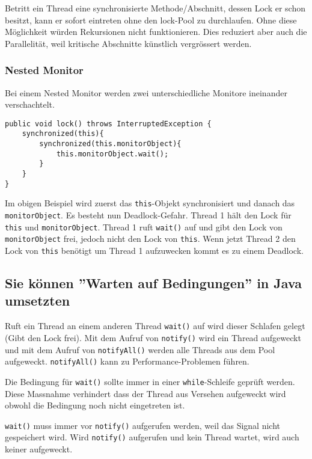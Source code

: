 Betritt ein Thread eine synchronisierte Methode/Abschnitt, dessen Lock er schon besitzt, kann er sofort eintreten ohne den lock-Pool zu durchlaufen. Ohne diese Möglichkeit würden Rekursionen nicht funktionieren. Dies reduziert aber auch die Parallelität, weil kritische Abschnitte künstlich vergrössert werden.

\subsubsection{Nested Monitor}

Bei einem Nested Monitor werden zwei unterschiedliche Monitore ineinander verschachtelt.

\begin{lstlisting}[caption={Nested Monitor},label=lst:nested_monitor]
public void lock() throws InterruptedException {
	synchronized(this){
		synchronized(this.monitorObject){
			this.monitorObject.wait();
		}
	}
}	  
\end{lstlisting}

Im obigen Beispiel wird zuerst das \texttt{this}-Objekt synchronisiert und danach das \texttt{monitorObject}. Es besteht nun Deadlock-Gefahr. Thread 1 hält den Lock für \texttt{this} und \texttt{monitorObject}. Thread 1 ruft \texttt{wait()} auf und gibt den Lock von \texttt{monitorObject} frei, jedoch nicht den Lock von \texttt{this}. Wenn jetzt Thread 2 den Lock von \texttt{this} benötigt um Thread 1 aufzuwecken kommt es zu einem Deadlock.

\subsection{Sie können ''Warten auf Bedingungen'' in Java umsetzten}

Ruft ein Thread an einem anderen Thread \texttt{wait()} auf wird dieser Schlafen gelegt (Gibt den Lock frei). Mit dem Aufruf von \texttt{notify()} wird ein Thread aufgeweckt und mit dem Aufruf von \texttt{notifyAll()} werden alle Threads aus dem Pool aufgeweckt. \texttt{notifyAll()} kann zu Performance-Problemen führen. 

Die Bedingung für \texttt{wait()} sollte immer in einer \texttt{while}-Schleife geprüft werden. Diese Massnahme verhindert dass der Thread aus Versehen aufgeweckt wird obwohl die Bedingung noch nicht eingetreten ist. 

\texttt{wait()} muss immer vor \texttt{notify()} aufgerufen werden, weil das Signal nicht gespeichert wird. Wird \texttt{notify()} aufgerufen und kein Thread wartet, wird auch keiner aufgeweckt.

